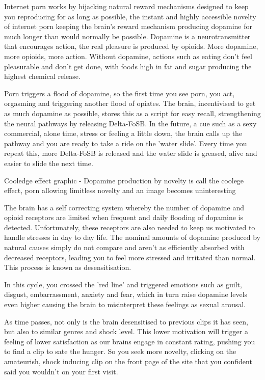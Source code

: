 \documentclass[easypeasy.tex]{subfiles}
\begin{document}
Internet porn works by hijacking natural reward mechanisms designed to keep you reproducing for as long as possible, the instant and highly accessible novelty of internet porn keeping the brain's reward mechanism producing dopamine for much longer than would normally be possible. Dopamine is a neurotransmitter that encourages action, the real pleasure is produced by opioids. More dopamine, more opioids, more action. Without dopamine, actions such as eating don't feel pleasurable and don't get done, with foods high in fat and sugar producing the highest chemical release.

Porn triggers a flood of dopamine, so the first time you see porn, you act, orgasming and triggering another flood of opiates. The brain, incentivised to get as much dopamine as possible, stores this as a script for easy recall, strengthening the neural pathways by releasing Delta-FoSB. In the future, a cue such as a sexy commercial, alone time, stress or feeling a little down, the brain calls up the pathway and you are ready to take a ride on the 'water slide'. Every time you repeat this, more Delta-FoSB is released and the water slide is greased, alive and easier to slide the next time.

Cooledge effect graphic - Dopamine production by novelty is call the coolege effect, porn allowing limitless novelty and an image becomes uninteresting

The brain has a self correcting system whereby the number of dopamine and opioid receptors are limited when frequent and daily flooding of dopamine is detected. Unfortunately, these receptors are also needed to keep us motivated to handle stresses in day to day life. The nominal amounts of dopamine produced by natural causes simply do not compare and aren't as efficiently absorbed with decreased receptors, leading you to feel more stressed and irritated than normal. This process is known as desensitisation.

In this cycle, you crossed the 'red line' and triggered emotions such as guilt, disgust, embarrassment, anxiety and fear, which in turn raise dopamine levels even higher causing the brain to misinterpret these feelings as sexual arousal.

As time passes, not only is the brain desensitised to previous clips it has seen, but also to similar genres and shock level. This lower motivation will trigger a feeling of lower satisfaction as our brains engage in constant rating, pushing you to find a clip to sate the hunger. So you seek more novelty, clicking on the amateurish, shock inducing clip on the front page of the site that you confident said you wouldn't on your first visit.
\end{document}

